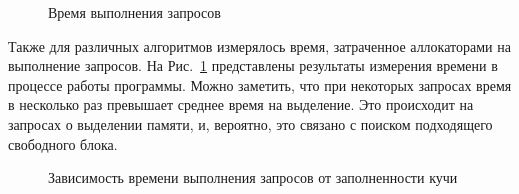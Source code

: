    \begin{figure}[p]
   \caption{Время выполнения запросов}
   \label{ris:image5}
   \end{figure}
   
   Также для различных алгоритмов измерялось время, затраченное аллокаторами на выполнение запросов. На Рис.~\ref{ris:image5} представлены 
результаты измерения времени в процессе работы программы. Можно заметить, что при некоторых запросах время в несколько раз превышает 
среднее время на выделение. Это происходит на запросах о выделении памяти, и, вероятно, это связано с поиском подходящего свободного блока. 
   
   \begin{figure}[p]
   \caption{Зависимость времени выполнения запросов от заполненности кучи}
   \label{ris:image6}
   \end{figure}
   
